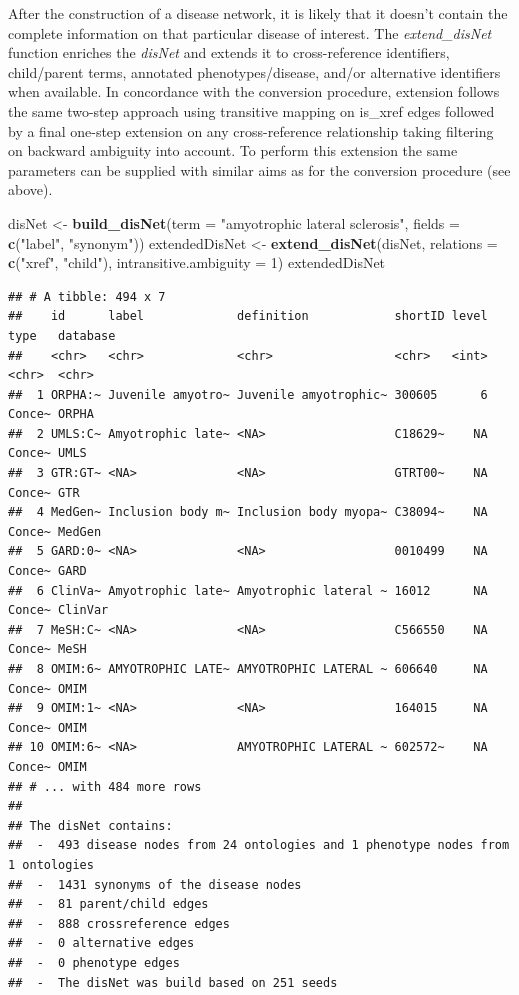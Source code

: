 \documentclass[9pt,a4paper,]{extarticle}
\newenvironment{Shaded}{\begin{snugshade}}{\end{snugshade}}
\newcommand{\DataTypeTok}[1]{\textcolor[rgb]{0.13,0.29,0.53}{#1}}
\newcommand{\DecValTok}[1]{\textcolor[rgb]{0.00,0.00,0.81}{#1}}
\newcommand{\KeywordTok}[1]{\textcolor[rgb]{0.13,0.29,0.53}{\textbf{#1}}}
\newcommand{\NormalTok}[1]{#1}
\newcommand{\StringTok}[1]{\textcolor[rgb]{0.31,0.60,0.02}{#1}}
\begin{document}
After the construction of a disease network, it is likely that it doesn't contain the complete information on that particular disease of interest. The \emph{extend\_disNet} function enriches the \emph{disNet} and extends it to cross-reference identifiers, child/parent terms, annotated phenotypes/disease, and/or alternative identifiers when available. In concordance with the conversion procedure, extension follows the same two-step approach using transitive mapping on is\_xref edges followed by a final one-step extension on any cross-reference relationship taking filtering on backward ambiguity into account. To perform this extension the same parameters can be supplied with similar aims as for the conversion procedure (see above).

\begin{Shaded}
\begin{Highlighting}[]
\NormalTok{disNet <-}\StringTok{ }\KeywordTok{build_disNet}\NormalTok{(}\DataTypeTok{term =} \StringTok{"amyotrophic lateral sclerosis"}\NormalTok{,}
                       \DataTypeTok{fields =} \KeywordTok{c}\NormalTok{(}\StringTok{"label"}\NormalTok{, }\StringTok{"synonym"}\NormalTok{))}
\NormalTok{extendedDisNet <-}\StringTok{ }\KeywordTok{extend_disNet}\NormalTok{(disNet,}
                                \DataTypeTok{relations =} \KeywordTok{c}\NormalTok{(}\StringTok{"xref"}\NormalTok{, }\StringTok{"child"}\NormalTok{),}
                                \DataTypeTok{intransitive.ambiguity =} \DecValTok{1}\NormalTok{)}
\NormalTok{extendedDisNet}
\end{Highlighting}
\end{Shaded}

\begin{verbatim}
## # A tibble: 494 x 7
##    id      label             definition            shortID level type   database
##    <chr>   <chr>             <chr>                 <chr>   <int> <chr>  <chr>   
##  1 ORPHA:~ Juvenile amyotro~ Juvenile amyotrophic~ 300605      6 Conce~ ORPHA   
##  2 UMLS:C~ Amyotrophic late~ <NA>                  C18629~    NA Conce~ UMLS    
##  3 GTR:GT~ <NA>              <NA>                  GTRT00~    NA Conce~ GTR     
##  4 MedGen~ Inclusion body m~ Inclusion body myopa~ C38094~    NA Conce~ MedGen  
##  5 GARD:0~ <NA>              <NA>                  0010499    NA Conce~ GARD    
##  6 ClinVa~ Amyotrophic late~ Amyotrophic lateral ~ 16012      NA Conce~ ClinVar 
##  7 MeSH:C~ <NA>              <NA>                  C566550    NA Conce~ MeSH    
##  8 OMIM:6~ AMYOTROPHIC LATE~ AMYOTROPHIC LATERAL ~ 606640     NA Conce~ OMIM    
##  9 OMIM:1~ <NA>              <NA>                  164015     NA Conce~ OMIM    
## 10 OMIM:6~ <NA>              AMYOTROPHIC LATERAL ~ 602572~    NA Conce~ OMIM    
## # ... with 484 more rows
## 
## The disNet contains:
##  -  493 disease nodes from 24 ontologies and 1 phenotype nodes from 1 ontologies 
##  -  1431 synonyms of the disease nodes
##  -  81 parent/child edges
##  -  888 crossreference edges
##  -  0 alternative edges
##  -  0 phenotype edges
##  -  The disNet was build based on 251 seeds
\end{verbatim}
\end{document}
